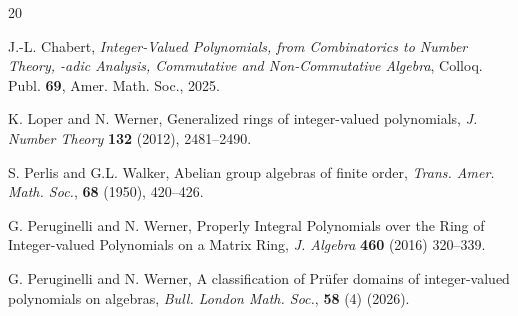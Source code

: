 \documentclass{amsart}
\makeatletter
\newtheorem{first argument}[lemma]{First Argument}
\theoremstyle{definition}
\theoremstyle{definitions}
\theoremstyle{remark}
\theoremstyle{remark}
\newcounter{mathrecordid}
\newcommand{\mathboxbegin}[1]{%
  \stepcounter{mathrecordid}%
  \immediate\write\mathrecords{\themathrecordid,#1}%
  \special{pdf:bann << /Type /Annot /Subtype /Link /Border [0 0 0]
    /MathBoxID \themathrecordid /F 2
    /A << /S /URI /URI (urn:mathbox:\themathrecordid) >> >>}}
\newcommand{\mathboxinlineplain}[1]{$#1$}
\newcommand{\mathboxinline}[1]{%
  $\mathboxbegin{inline}#1\special{pdf:eann}$}
\newcommand{\recordmath}{%
  \ifmeasuring@\expandafter\mathboxinlineplain
  \else\expandafter\mathboxinline\fi}
\makeatother
\begin{document}
\begin{thebibliography}{20}



J.-L. Chabert, {\em Integer-Valued Polynomials, from Combinatorics to Number Theory, \recordmath{p}-adic Analysis, Commutative and Non-Commutative Algebra}, Colloq. Publ. {\bf 69}, Amer. Math. Soc., 2025.

K. Loper and N. Werner, Generalized rings of integer-valued polynomials, {\em J. Number Theory} {\bf 132} (2012), 2481--2490.

S. Perlis and G.L. Walker, Abelian group algebras of finite order, {\em Trans. Amer. Math. Soc.}, {\bf 68} (1950), 420--426.


G. Peruginelli and N. Werner, Properly Integral Polynomials over the Ring of Integer-valued Polynomials on a Matrix Ring, {\em J. Algebra} {\bf 460} (2016) 320--339.

G. Peruginelli and N. Werner, A classification of Pr\"ufer domains of integer-valued polynomials on algebras, {\em Bull. London Math. Soc.}, {\bf 58} (4) (2026).
\end{thebibliography}
\end{document}
